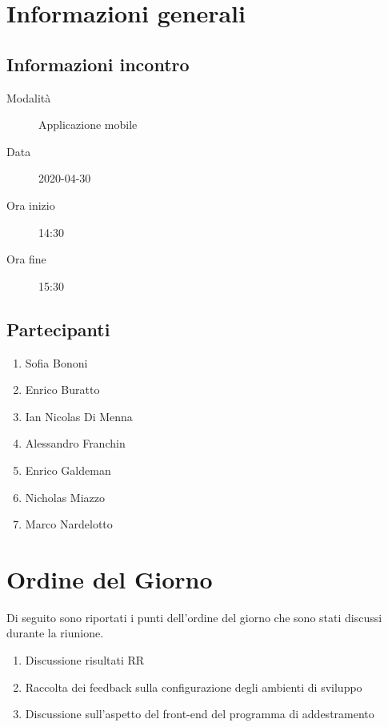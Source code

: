 \documentclass{article}
\begin{document}


\section{Informazioni generali}%
\label{sec:informazioni_generali}

\subsection{Informazioni incontro}%
\label{sub:informazioni_incontro}

\begin{description}
  \item[Modalità] Applicazione mobile 
  \item[Data] 2020-04-30
  \item[Ora inizio] 14:30
  \item[Ora fine] 15:30
\end{description}

\subsection{Partecipanti}%
\label{sub:partecipanti}

\begin{enumerate}
  \item Sofia Bononi
  \item Enrico Buratto
  \item Ian Nicolas Di Menna
  \item Alessandro Franchin
  \item Enrico Galdeman
  \item Nicholas Miazzo
  \item Marco Nardelotto
\end{enumerate}

\section{Ordine del Giorno}%
\label{ordine_del_giorno}
Di seguito sono riportati i punti dell'ordine del giorno che sono stati discussi durante la riunione.
\begin{enumerate}
  \item Discussione risultati RR
  \item Raccolta dei feedback sulla configurazione degli ambienti di sviluppo
  \item Discussione sull'aspetto del front-end del programma di addestramento
\end{enumerate}
\end{document}
